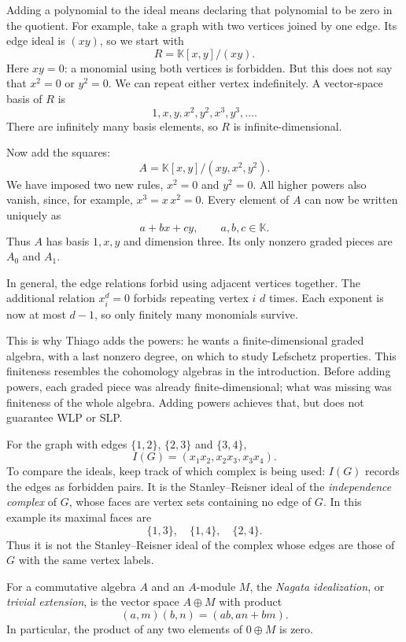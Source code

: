 \begin{remark}
\label{remark-why-thiago-adds-powers}
Adding a polynomial to the ideal means
declaring that polynomial to be zero in
the quotient. For example, take a graph
with two vertices joined by one edge.
Its edge ideal is $(xy)$, so we start with
$$
R=\mathbb{K}[x,y]/(xy).
$$
Here $xy=0$: a monomial using both
vertices is forbidden. But this does not
say that $x^2=0$ or $y^2=0$.
We can repeat either vertex indefinitely.
A vector-space basis of $R$ is
$$
1,x,y,x^2,y^2,x^3,y^3,\ldots.
$$
There are infinitely many basis elements,
so $R$ is infinite-dimensional.

Now add the squares:
$$
A=\mathbb{K}[x,y]/(xy,x^2,y^2).
$$
We have imposed two new rules,
$x^2=0$ and $y^2=0$. All higher powers
also vanish, since, for example,
$x^3=x\,x^2=0$.
Every element of $A$ can now be written
uniquely as
$$
a+bx+cy,\qquad a,b,c\in\mathbb{K}.
$$
Thus $A$ has basis $1,x,y$ and dimension
three. Its only nonzero graded pieces are
$A_0$ and $A_1$.

In general, the edge relations forbid
using adjacent vertices together.
The additional relation $x_i^d=0$
forbids repeating vertex $i$ $d$ times.
Each exponent is now at most $d-1$,
so only finitely many monomials survive.

This is why Thiago adds the powers:
he wants a finite-dimensional graded
algebra, with a last nonzero degree,
on which to study Lefschetz properties.
This finiteness resembles the cohomology
algebras in the introduction.
Before adding powers, each graded piece
was already finite-dimensional; what was
missing was finiteness of the whole
algebra. Adding powers achieves that,
but does not guarantee WLP or SLP.
\end{remark}

\begin{example}
\label{example-path-edge-ideal}
For the graph with edges
$\{1,2\}$, $\{2,3\}$ and $\{3,4\}$,
$$
I(G)=(x_1x_2,x_2x_3,x_3x_4).
$$
To compare the ideals, keep track of
which complex is being used:
$I(G)$ records the edges as forbidden
pairs. It is the Stanley--Reisner ideal
of the \emph{independence complex} of $G$,
whose faces are vertex sets containing
no edge of $G$.
In this example its maximal faces are
$$
\{1,3\},\quad\{1,4\},\quad\{2,4\}.
$$
Thus it is not the Stanley--Reisner ideal
of the complex whose edges are those of
$G$ with the same vertex labels.
\end{example}

\begin{definition}
\label{definition-nagata-idealization}
For a commutative algebra $A$ and an
$A$-module $M$, the \emph{Nagata
idealization}, or \emph{trivial extension},
is the vector space $A\oplus M$ with
product
$$
(a,m)(b,n)=(ab,an+bm).
$$
In particular, the product of any two
elements of $0\oplus M$ is zero.
\end{definition}

